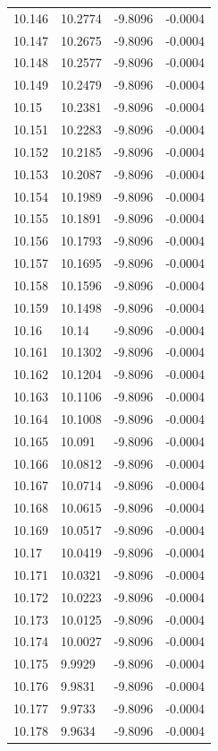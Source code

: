 \begin{tabular}{llll}
10.146 & 10.2774 & -9.8096 & -0.0004 \\
10.147 & 10.2675 & -9.8096 & -0.0004 \\
10.148 & 10.2577 & -9.8096 & -0.0004 \\
10.149 & 10.2479 & -9.8096 & -0.0004 \\
10.15 & 10.2381 & -9.8096 & -0.0004 \\
10.151 & 10.2283 & -9.8096 & -0.0004 \\
10.152 & 10.2185 & -9.8096 & -0.0004 \\
10.153 & 10.2087 & -9.8096 & -0.0004 \\
10.154 & 10.1989 & -9.8096 & -0.0004 \\
10.155 & 10.1891 & -9.8096 & -0.0004 \\
10.156 & 10.1793 & -9.8096 & -0.0004 \\
10.157 & 10.1695 & -9.8096 & -0.0004 \\
10.158 & 10.1596 & -9.8096 & -0.0004 \\
10.159 & 10.1498 & -9.8096 & -0.0004 \\
10.16 & 10.14 & -9.8096 & -0.0004 \\
10.161 & 10.1302 & -9.8096 & -0.0004 \\
10.162 & 10.1204 & -9.8096 & -0.0004 \\
10.163 & 10.1106 & -9.8096 & -0.0004 \\
10.164 & 10.1008 & -9.8096 & -0.0004 \\
10.165 & 10.091 & -9.8096 & -0.0004 \\
10.166 & 10.0812 & -9.8096 & -0.0004 \\
10.167 & 10.0714 & -9.8096 & -0.0004 \\
10.168 & 10.0615 & -9.8096 & -0.0004 \\
10.169 & 10.0517 & -9.8096 & -0.0004 \\
10.17 & 10.0419 & -9.8096 & -0.0004 \\
10.171 & 10.0321 & -9.8096 & -0.0004 \\
10.172 & 10.0223 & -9.8096 & -0.0004 \\
10.173 & 10.0125 & -9.8096 & -0.0004 \\
10.174 & 10.0027 & -9.8096 & -0.0004 \\
10.175 & 9.9929 & -9.8096 & -0.0004 \\
10.176 & 9.9831 & -9.8096 & -0.0004 \\
10.177 & 9.9733 & -9.8096 & -0.0004 \\
10.178 & 9.9634 & -9.8096 & -0.0004 \\

\end{tabular}
